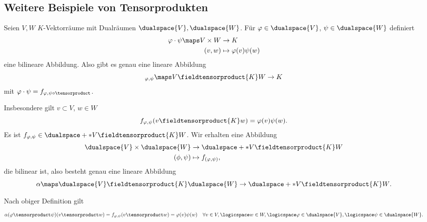 \subsection{Weitere Beispiele von Tensorprodukten}
\begin{beispiel}
  Seien \( V,W \) \( K \)-Vektorräume mit Dualräumen \( \dualspace{V}, \dualspace{W} \). Für \( \varphi\in \dualspace{V} \), \( \psi\in \dualspace{W} \) definiert
  \begin{align*}
    \varphi\cdot\psi\maps V\times W&\to K\\
    (v,w)&\mapsto \varphi(v)\psi(w)
  \end{align*}
  eine bilineare Abbildung. Also gibt es genau eine lineare Abbildung
  \begin{equation*}
    _{\varphi,\psi}\maps V\fieldtensorproduct{K} W\to K
  \end{equation*}
  mit \( \varphi\cdot \psi=f_{\varphi,\psi\circ \tensorproduct} \).

  Insbesondere gilt \tforall \( v\subset V \), \( w\in W \)
  \begin{equation*}
    f_{\varphi,\psi}(v\fieldtensorproduct{K}w)=\varphi(v)\psi(w).
  \end{equation*}
  Es ist \( f_{\varphi,\psi}\in \dualspace+*{V\fieldtensorproduct{K}W} \). Wir erhalten eine Abbildung
  \begin{align*}
    \dualspace{V}\times \dualspace{W}&\to \dualspace+*{V\fieldtensorproduct{K}W}\\
    (\phi,\psi)&\mapsto f_{(\varphi,\psi)},
  \end{align*}
  die bilinear ist, also besteht genau eine lineare Abbildung
  \begin{equation*}
    \alpha\maps \dualspace{V}\fieldtensorproduct{K}\dualspace{W}\to \dualspace+*{V\fieldtensorproduct{K}W}.
  \end{equation*}
\end{beispiel}
\begin{bemerkung*}
  Nach obiger Definition gilt
  \begin{equation*}
    \alpha(\varphi \tensorproduct \psi)(v\tensorproduct w) =f_{\varphi,\psi}(v\tensorproduct w)=\varphi(v)\psi(w)\quad \forall v\in V,\logicspace w\in W,\logicspace \varphi\in \dualspace{V},\logicspace \psi\in \dualspace{W}.
  \end{equation*}
\end{bemerkung*}
